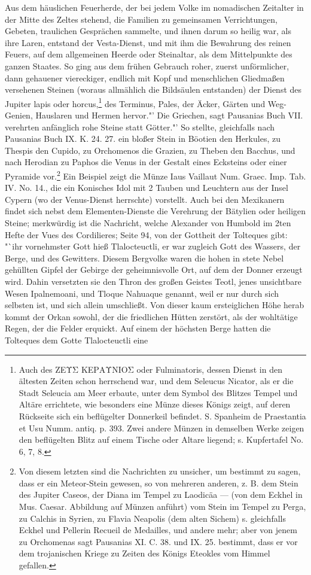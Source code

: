 \documentclass[a4paper, 11pt, oneside, polutonikogreek, german]{article}
\begin{document}
Aus dem häuslichen Feuerherde, der bei jedem Volke im nomadischen Zeitalter in der Mitte des Zeltes stehend, die Familien zu gemeinsamen Verrichtungen, Gebeten, traulichen Gesprächen sammelte, und ihnen darum so heilig war, als ihre Laren, entstand der Vesta-Dienst, und mit ihm die Bewahrung des reinen Feuers, auf dem allgemeinen Heerde oder Steinaltar, als dem Mittelpunkte des ganzen Staates. So ging aus dem frühen Gebrauch roher, zuerst unförmlicher, dann gehauener viereckiger, endlich mit Kopf und menschlichen Gliedmaßen versehenen Steinen (woraus allmählich die Bildsäulen entstanden) der Dienst des Jupiter lapis oder horcus,\footnote{Auch des ΖΕΥΣ ΚΕΡΑΥNIOΣ oder Fulminatoris, dessen Dienst in den ältesten Zeiten schon herrschend war, und dem Seleucus Nicator, als er die Stadt Seleucia am Meer erbaute, unter dem Symbol des Blitzes Tempel und Altäre errichtete, wie besonders eine Münze dieses Königs zeigt, auf deren Rückseite sich ein beflügelter Donnerkeil befindet. S. Spanheim de Praestantia et Usu Numm. antiq. p. 393. Zwei andere Münzen in demselben Werke zeigen den beflügelten Blitz auf einem Tische oder Altare liegend; s. Kupfertafel No. 6, 7, 8.} des Terminus, Pales, der Äcker, Gärten und Weg- Genien, Hauslaren und Hermen hervor."' Die Griechen, sagt Pausanias Buch VII. verehrten anfänglich rohe Steine statt Götter."' So stellte, gleichfalls nach Pausanias Buch IX. K. 24. 27. ein bloßer Stein in Böotien den Herkules, zu Thespis den Cupido, zu Orchomenos die Grazien, zu Theben den Bacchus, und nach Herodian zu Paphos die Venus in der Gestalt eines Ecksteins oder einer Pyramide vor.\footnote{Von diesem letzten sind die Nachrichten zu unsicher, um bestimmt zu sagen, dass er ein Meteor-Stein gewesen, so von mehreren anderen, z. B. dem Stein des Jupiter Caseos, der Diana im Tempel zu Laodicäa --- (von dem Eckhel in Mus. Caesar. Abbildung auf Münzen anführt) vom Stein im Tempel zu Perga, zu Calchis in Syrien, zu Flavia Neapolis (dem alten Sichem) s. gleichfalls Eckhel und Pellerin Recueil de Medailles, und andere mehr; aber von jenem zu Orchomenas sagt Pausanias XI. C. 38. und IX. 25. bestimmt, dass er vor dem trojanischen Kriege zu Zeiten des Königs Eteokles vom Himmel gefallen.} Ein Beispiel zeigt die Münze Iaus Vaillaut Num. Graec. Imp. Tab. IV. No. 14., die ein Konisches Idol mit 2 Tauben und Leuchtern aus der Insel Cypern (wo der Venus-Dienst herrschte) vorstellt. Auch bei den Mexikanern findet sich nebst dem Elementen-Dienste die Verehrung der Bätylien oder heiligen Steine; merkwürdig ist die Nachricht, welche Alexander von Humbold im 2ten Hefte der Vues des Cordilieres; Seite 94, von der Gottheit der Tolteques gibt: "`ihr vornehmster Gott hieß Tlalocteuctli, er war zugleich Gott des Wassers, der Berge, und des Gewitters. Diesem Bergvolke waren die hohen in stete Nebel gehüllten Gipfel der Gebirge der geheimnisvolle Ort, auf dem der Donner erzeugt wird. Dahin versetzten sie den Thron des großen Geistes Teotl, jenes unsichtbare Wesen Ipalnemoani, und Tloque Nahuaque genannt, weil er nur durch sich selbsten ist, und sich allein umschließt. Von dieser kaum ersteiglichen Höhe herab kommt der Orkan sowohl, der die friedlichen Hütten zerstört, als der wohltätige Regen, der die Felder erquickt. Auf einem der höchsten Berge hatten die Tolteques dem Gotte Tlalocteuctli eine 
\end{document}
